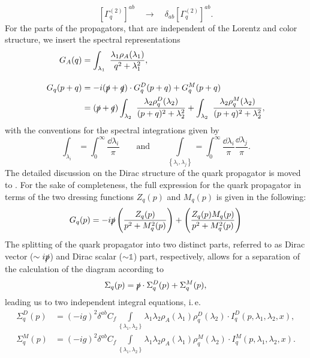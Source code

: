 \begin{equation}
\left[\Gamma_{q}^{(2)}\right]^{a b}\quad \longrightarrow\quad \delta_{a b} \left[\Gamma_{q}^{(2)}\right]^{a b}.
\end{equation}
For the parts of the propagators, that are independent of the Lorentz and color structure, we insert the spectral representations
\begin{align}
G_{A}(q)&= \int_{\lambda_1}\ \frac{\lambda_1\rho_A(\lambda_1)}{q^{2}+\lambda_1^{2}},\label{eqn:GluonSpec}\\[1em]
G_q(p+q) &= -i(\slashed{p}+\slashed{q})\cdot G_{q}^{D}(p+q)+G_{q}^M(p+q)\nonumber \\
&= (\slashed{p}+\slashed{q}) \int_{\lambda_2}\ \frac{\lambda_2\rho_{q}^D(\lambda_2)}{(p+q)^{2}+\lambda_2^2}+ \int_{\lambda_2}\ \frac{\lambda_2\rho_{q}^M(\lambda_2)}{(p+q)^{2}+\lambda_2^2},\label{eqn:QuarkSpecFunc}
\end{align}
with the conventions for the spectral integrations given by
\begin{equation}
	\int_{\lambda_i} = \int_0^{\infty} \frac{\dd\lambda_i}{\pi} \qquad \text{and} \qquad \int\limits_{\left\{\lambda_i,\lambda_j\right\}} = \int_0^{\infty} \frac{\dd\lambda_i}{\pi}\frac{\dd\lambda_j}{\pi}.	 
\end{equation}
The detailed discussion on the Dirac structure of the quark propagator is moved to . For the sake of completeness, the full expression for the quark propagator in terms of the two dressing functions $Z_q(p)$ and $M_q(p)$ is given in the following:
\begin{equation}
	G_q(p) =  -i\slashed{p} \left(\frac{Z_q(p)}{p^2 + M_q^2(p)}\right) +  \left(\frac{Z_q(p)M_q(p)}{p^2 + M_q^2(p)}\right)
\end{equation}
The splitting of the quark propagator into two distinct parts, referred to as Dirac vector ($\sim i\slashed{p}$) and Dirac scalar ($\sim\mathbb{1}$) part, respectively, allows for a separation of the calculation of the diagram according to
\begin{equation}
	\Sigma_q(p) =\slashed{p}\cdot\Sigma_{q}^D(p) + \Sigma_{q}^M(p),
\end{equation}
leading us to two independent integral equations, i.\,e.
\begin{align}
\Sigma_{q}^D(p) &= (-ig)^2\delta^{ab}C_f\int\limits_{\left\{\lambda_1,\lambda_2\right\}}\lambda_1\lambda_2\rho_A(\lambda_1)\rho_q^D(\lambda_2)\cdot I_q^D\left(p, \lambda_1, \lambda_2,x\right),\\
\Sigma_{q}^M(p) &= (-ig)^2\delta^{ab}C_f\int\limits_{\left\{\lambda_1,\lambda_2\right\}}\lambda_1\lambda_2\rho_A(\lambda_1)\rho_q^M(\lambda_2)\cdot I_q^M\left(p, \lambda_1, \lambda_2,x\right).
\end{align}
